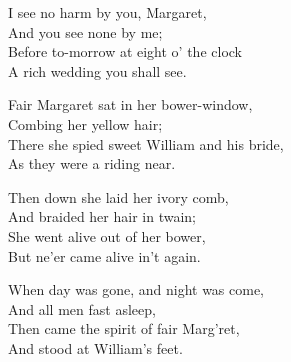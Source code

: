 \settowidth{\versewidth}{There she spied sweet William and his bride,}
\begin{dcverse}\begin{altverse}
I see no harm by you, Margaret,\\
And you see none by me;\\
Before to-morrow at eight o’ the clock\\
A rich wedding you shall see.
\end{altverse}

\begin{altverse}
Fair Margaret sat in her bower-window,\\
Combing her yellow hair;\\
There she spied sweet William and his bride,\\
As they were a riding near.
\end{altverse}

\begin{altverse}
Then down she laid her ivory comb,\\
And braided her hair in twain;\\
She went alive out of her bower,\\
But ne'er came alive in’t again.
\end{altverse}

\begin{altverse}
When day was gone, and night was come,\\
And all men fast asleep,\\
Then came the spirit of fair Marg’ret,\\
And stood at William’s feet.
\end{altverse}
\end{dcverse}
\pagebreak%

